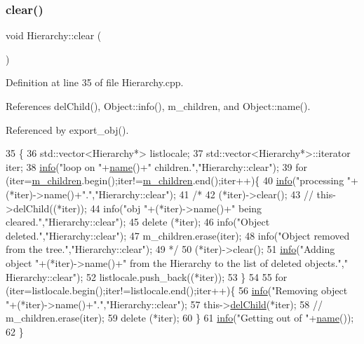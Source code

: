 \subsubsection{\texorpdfstring{clear()}{clear()}}
{\footnotesize\ttfamily void Hierarchy\+::clear (\begin{DoxyParamCaption}{ }\end{DoxyParamCaption})}



Definition at line 35 of file Hierarchy.\+cpp.



References del\+Child(), Object\+::info(), m\+\_\+children, and Object\+::name().



Referenced by export\+\_\+obj().


\begin{DoxyCode}
35                      \{
36   std::vector<Hierarchy*> listlocale;
37   std::vector<Hierarchy*>::iterator iter;
38   \hyperlink{classObject_a644fd329ea4cb85f54fa6846484b84a8}{info}(\textcolor{stringliteral}{"loop on "}+\hyperlink{classObject_a300f4c05dd468c7bb8b3c968868443c1}{name}()+\textcolor{stringliteral}{" children."},\textcolor{stringliteral}{"Hierarchy::clear"});
39   \textcolor{keywordflow}{for} (iter=\hyperlink{classHierarchy_a038816763941fd4a930504917f60483b}{m\_children}.begin();iter!=\hyperlink{classHierarchy_a038816763941fd4a930504917f60483b}{m\_children}.end();iter++)\{
40       \hyperlink{classObject_a644fd329ea4cb85f54fa6846484b84a8}{info}(\textcolor{stringliteral}{"processing "}+(*iter)->name()+\textcolor{stringliteral}{"."},\textcolor{stringliteral}{"Hierarchy::clear"});
41 \textcolor{comment}{/*}
42 \textcolor{comment}{      (*iter)->clear();
}
43 \textcolor{comment}{//      this->delChild((*iter));
}
44 \textcolor{comment}{      info("obj "+(*iter)->name()+" being cleared.","Hierarchy::clear");
}
45 \textcolor{comment}{      delete (*iter);
}
46 \textcolor{comment}{      info("Object deleted.","Hierarchy::clear");
}
47 \textcolor{comment}{      m\_children.erase(iter);
}
48 \textcolor{comment}{      info("Object removed from the tree.","Hierarchy::clear");
}
49 \textcolor{comment}{*/}
50     (*iter)->clear();
51     \hyperlink{classObject_a644fd329ea4cb85f54fa6846484b84a8}{info}(\textcolor{stringliteral}{"Adding object "}+(*iter)->name()+\textcolor{stringliteral}{" from the Hierarchy to the list of deleted objects."},\textcolor{stringliteral}{"
      Hierarchy::clear"});
52     listlocale.push\_back((*iter));
53   \}
54 
55   \textcolor{keywordflow}{for} (iter=listlocale.begin();iter!=listlocale.end();iter++)\{
56     \hyperlink{classObject_a644fd329ea4cb85f54fa6846484b84a8}{info}(\textcolor{stringliteral}{"Removing object "}+(*iter)->name()+\textcolor{stringliteral}{"."},\textcolor{stringliteral}{"Hierarchy::clear"});
57     this->\hyperlink{classHierarchy_a2b2b359fac003233f65786a616766bde}{delChild}(*iter);
58 \textcolor{comment}{//    m\_children.erase(iter);}
59     \textcolor{keyword}{delete} (*iter);
60   \}
61   \hyperlink{classObject_a644fd329ea4cb85f54fa6846484b84a8}{info}(\textcolor{stringliteral}{"Getting out of "}+\hyperlink{classObject_a300f4c05dd468c7bb8b3c968868443c1}{name}());
62 \}
\end{DoxyCode}
